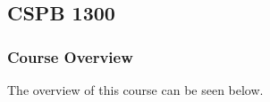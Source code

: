 \clearpage

\renewcommand{\ChapTitle}{\CSPBIntro}
\renewcommand{\SectionTitle}{CSPB 1300}

\chapter{\ChapTitle}
\section{\SectionTitle}

\subsection{Course Overview}

The overview of this course can be seen below.

